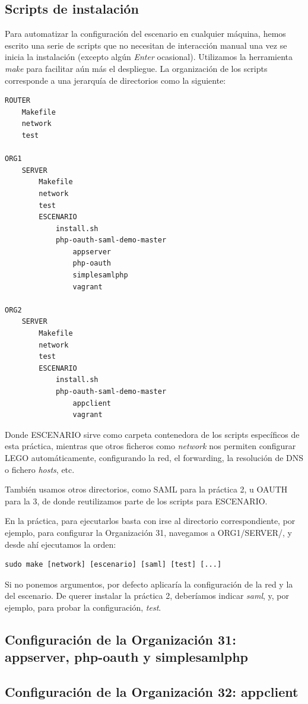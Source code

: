\documentclass[]{article}
\begin{document}
\subsection{Scripts de instalación}

Para automatizar la configuración del escenario en cualquier máquina, hemos escrito una serie de scripts que no necesitan de interacción manual una
vez se inicia la instalación (excepto algún \textit{Enter} ocasional). Utilizamos la herramienta \textit{make} para facilitar aún más
el despliegue. La organización de los scripts corresponde a una jerarquía de directorios como la siguiente:

\hfil

\begin{BVerbatim}
ROUTER
	Makefile
	network
	test

ORG1
	SERVER
		Makefile
		network
		test
		ESCENARIO
			install.sh
			php-oauth-saml-demo-master
				appserver
				php-oauth
				simplesamlphp
				vagrant

ORG2
	SERVER
		Makefile
		network
		test
		ESCENARIO
			install.sh
			php-oauth-saml-demo-master
				appclient
				vagrant
\end{BVerbatim}

\hfill


Donde ESCENARIO sirve como carpeta contenedora de los scripts específicos de esta práctica, mientras que otros ficheros como \textit{network} nos
permiten configurar LEGO automáticamente, configurando la red, el forwarding, la resolución de DNS o fichero \textit{hosts}, etc.

También usamos otros directorios, como SAML para la práctica 2, u OAUTH para la 3, de donde reutilizamos parte de los scripts para ESCENARIO.


\hfill

En la práctica, para ejecutarlos basta con irse al directorio correspondiente, por ejemplo, para configurar la Organización 31, navegamos a ORG1/SERVER/, y desde ahí
ejecutamos la orden:

\begin{verbatim}
sudo make [network] [escenario] [saml] [test] [...]
\end{verbatim}

Si no ponemos argumentos, por defecto aplicaría la configuración de la red y la del escenario. De querer instalar la práctica 2, deberíamos indicar \textit{saml}, y, por ejemplo, para
probar la configuración, \textit{test}.


\subsection{Configuración de la Organización 31: appserver, php-oauth y simplesamlphp}

\subsection{Configuración de la Organización 32: appclient}
\end{document}
